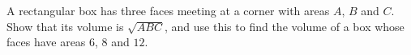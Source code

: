 A rectangular box has three faces meeting at a corner with areas $A$, $B$ and $C$. Show that its volume is $\sqrt{ABC}$, and use this to find the volume of a box whose faces have areas $6$, $8$ and $12$.
